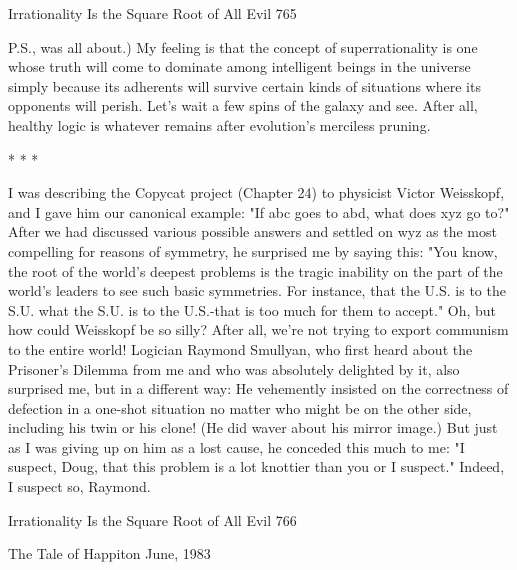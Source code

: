 Irrationality Is the Square Root of All Evil                                       765

P.S., was all about.) My feeling is that the concept of superrationality is one whose
truth will come to dominate among intelligent beings in the universe simply because
its adherents will survive certain kinds of situations where its opponents will perish.
Let's wait a few spins of the galaxy and see. After all, healthy logic is whatever
remains after evolution's merciless pruning.

                                        *      *   *

       I was describing the Copycat project (Chapter 24) to physicist Victor
Weisskopf, and I gave him our canonical example: "If abc goes to abd, what does xyz
go to?" After we had discussed various possible answers and settled on wyz as the
most compelling for reasons of symmetry, he surprised me by saying this: "You
know, the root of the world's deepest problems is the tragic inability on the part of the
world's leaders to see such basic symmetries. For instance, that the U.S. is to the S.U.
what the S.U. is to the U.S.-that is too much for them to accept." Oh, but how could
Weisskopf be so silly? After all, we're not trying to export communism to the entire
world!
       Logician Raymond Smullyan, who first heard about the Prisoner's Dilemma
from me and who was absolutely delighted by it, also surprised me, but in a different
way: He vehemently insisted on the correctness of defection in a one-shot situation no
matter who might be on the other side, including his twin or his clone! (He did waver
about his mirror image.) But just as I was giving up on him as a lost cause, he
conceded this much to me: "I suspect, Doug, that this problem is a lot knottier than
you or I suspect." Indeed, I suspect so, Raymond.




Irrationality Is the Square Root of All Evil                                         766


                          The Tale of Happiton
                                      June, 1983


